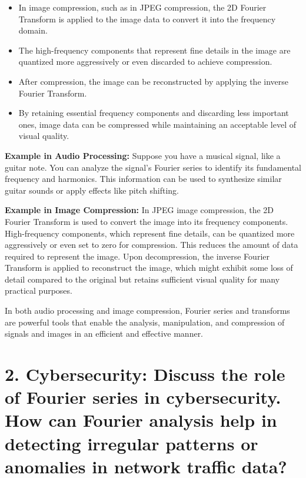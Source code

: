 \documentclass[11pt]{article}
\providecommand{\tightlist}{%
      \setlength{\itemsep}{0pt}\setlength{\parskip}{0pt}}
\begin{document}
\begin{enumerate}
  \begin{itemize}
  \tightlist
  \item
    In image compression, such as in JPEG compression, the 2D Fourier
    Transform is applied to the image data to convert it into the
    frequency domain.
  \item
    The high-frequency components that represent fine details in the
    image are quantized more aggressively or even discarded to achieve
    compression.
  \item
    After compression, the image can be reconstructed by applying the
    inverse Fourier Transform.
  \item
    By retaining essential frequency components and discarding less
    important ones, image data can be compressed while maintaining an
    acceptable level of visual quality.
  \end{itemize}
\end{enumerate}

\textbf{Example in Audio Processing:} Suppose you have a musical signal,
like a guitar note. You can analyze the signal's Fourier series to
identify its fundamental frequency and harmonics. This information can
be used to synthesize similar guitar sounds or apply effects like pitch
shifting.

\textbf{Example in Image Compression:} In JPEG image compression, the 2D
Fourier Transform is used to convert the image into its frequency
components. High-frequency components, which represent fine details, can
be quantized more aggressively or even set to zero for compression. This
reduces the amount of data required to represent the image. Upon
decompression, the inverse Fourier Transform is applied to reconstruct
the image, which might exhibit some loss of detail compared to the
original but retains sufficient visual quality for many practical
purposes.

In both audio processing and image compression, Fourier series and
transforms are powerful tools that enable the analysis, manipulation,
and compression of signals and images in an efficient and effective
manner.

    \hypertarget{cybersecurity-discuss-the-role-of-fourier-series-in-cybersecurity.-how-can-fourier-analysis-help-in-detecting-irregular-patterns-or-anomalies-in-network-traffic-data}{%
\section{2. Cybersecurity: Discuss the role of Fourier series in
cybersecurity. How can Fourier analysis help in detecting irregular
patterns or anomalies in network traffic
data?}\label{cybersecurity-discuss-the-role-of-fourier-series-in-cybersecurity.-how-can-fourier-analysis-help-in-detecting-irregular-patterns-or-anomalies-in-network-traffic-data}}
\end{document}

